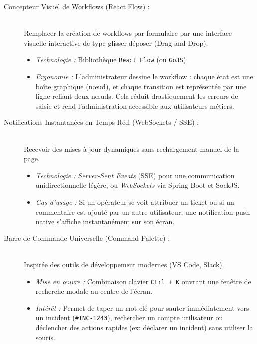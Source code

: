 \documentclass[12pt,a4paper]{article}
\begin{document}
\begin{description}
    \item[Concepteur Visuel de Workflows (React Flow) :] \hfill \\
    Remplacer la création de workflows par formulaire par une interface visuelle interactive de type glisser-déposer (Drag-and-Drop).
    \begin{itemize}
        \item \textit{Technologie :} Bibliothèque \texttt{React Flow} (ou \texttt{GoJS}).
        \item \textit{Ergonomie :} L'administrateur dessine le workflow : chaque état est une boîte graphique (nœud), et chaque transition est représentée par une ligne reliant deux nœuds. Cela réduit drastiquement les erreurs de saisie et rend l'administration accessible aux utilisateurs métiers.
    \end{itemize}

    \item[Notifications Instantanées en Temps Réel (WebSockets / SSE) :] \hfill \\
    Recevoir des mises à jour dynamiques sans rechargement manuel de la page.
    \begin{itemize}
        \item \textit{Technologie :} \textit{Server-Sent Events} (SSE) pour une communication unidirectionnelle légère, ou \textit{WebSockets} via Spring Boot et SockJS.
        \item \textit{Cas d'usage :} Si un opérateur se voit attribuer un ticket ou si un commentaire est ajouté par un autre utilisateur, une notification push native s'affiche instantanément sur son écran.
    \end{itemize}

    \item[Barre de Commande Universelle (Command Palette) :] \hfill \\
    Inspirée des outils de développement modernes (VS Code, Slack).
    \begin{itemize}
        \item \textit{Mise en œuvre :} Combinaison clavier \texttt{Ctrl + K} ouvrant une fenêtre de recherche modale au centre de l'écran.
        \item \textit{Intérêt :} Permet de taper un mot-clé pour sauter immédiatement vers un incident (\texttt{\#INC-1243}), rechercher un compte utilisateur ou déclencher des actions rapides (ex: déclarer un incident) sans utiliser la souris.
    \end{itemize}


\end{description}
\end{document}
